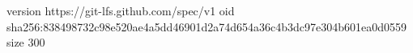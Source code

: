 version https://git-lfs.github.com/spec/v1
oid sha256:838498732c98e520ae4a5dd46901d2a74d654a36c4b3dc97e304b601ea0d0559
size 300

